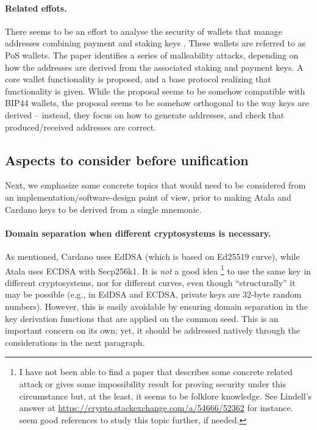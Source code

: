 \paragraph{Related effots.} There seems to be an effort to analyse the security
of wallets that manage addresses combining payment and staking keys \cite{kkl20}.
These wallets are referred to as PoS wallets. The paper identifies a series of
malleability attacks, depending on how the addresses are derived from the
associated staking and payment keys. A core wallet functionality is proposed,
and a base protocol realizing that functionality is given. While the proposal
seems to be somehow compatible with BIP44 wallets, the proposal seems to be
somehow orthogonal to the way keys are derived -- instead, they focus on how
to generate addresses, and check that produced/received addresses are correct.

\subsection{Aspects to consider before unification}
\label{ssec:unification}

Next, we emphasize some concrete topics that would need to be considered
from an implementation/software-design point of view, prior to making
Atala and Cardano keys to be derived from a single mnemonic.

\paragraph{Domain separation when different cryptosystems is
  necessary.} %
As mentioned, Cardano uses EdDSA (which is based on Ed25519 curve),
while Atala uses ECDSA with Secp256k1. It is \emph{not} a good idea%
\footnote{I have not been able to find a paper that describes
  some concrete related attack or gives some impossibility result for
  proving security under this circumstance but, at the least, it seems to
  be folklore knowledge. See Lindell's answer at
  \url{https://crypto.stackexchange.com/a/54666/52362} for instance.
  \cite{dlp12+,thorm21} seem good references to study this topic further, if
  needed.} to use the same key in different cryptosystems, nor for different
curves, even though ``structurally'' it may be possible (e.g., in EdDSA and
ECDSA, private keys are 32-byte random numbers). However, this is easily
avoidable by ensuring domain separation in the key derivation functions that
are applied on the common seed. This is an important concern on its own; yet,
it should be addressed natively through the considerations in the next
paragraph.

